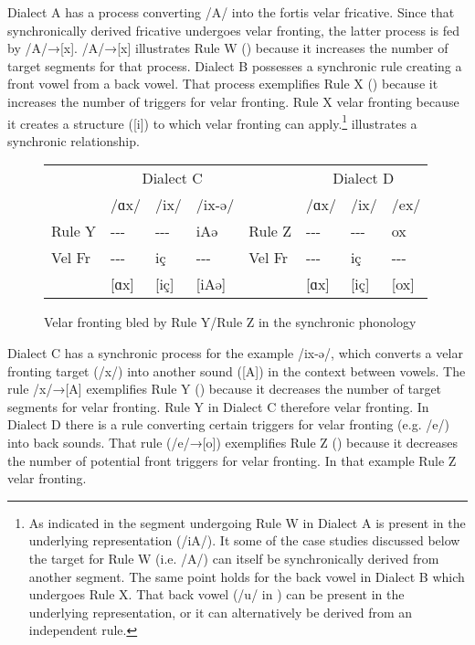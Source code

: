 \begin{xlist}
\begin{xlist}
Dialect A has  a process converting /A/ into the fortis velar fricative. Since that synchronically derived fricative undergoes velar fronting, the latter process is fed by /A/→[x]. /A/→[x] illustrates Rule W () because it increases the number of target segments for that process. Dialect B possesses a synchronic rule creating a front vowel from a back vowel. That process exemplifies Rule X () because it increases the number of triggers for velar fronting. Rule X  velar fronting because it creates a structure ([i]) to which velar fronting can apply.\footnote{\label{fn:2:25}As indicated in  the segment undergoing Rule W in Dialect A is present in the underlying representation (/iA/). It some of the case studies discussed below the target for Rule W (i.e. /A/) can itself be synchronically derived from another segment. The same point holds for the back vowel in Dialect B which undergoes Rule X. That back vowel (/u/ in ) can be present in the underlying representation, or it can alternatively be derived from an independent rule.}  illustrates a synchronic  relationship.

\begin{figure}
\begin{tabular}{*8{l}}
         &  \multicolumn{3}{c}{Dialect C}      &         & \multicolumn{3}{c}{Dialect D} \\\cmidrule(lr){2-4}\cmidrule(lr){6-8}
         &  /ɑx/     &  /ix/       &  /ix-ə/   &         & /ɑx/      & /ix/      & /ex/      \\
  Rule Y & {}-{}-{}- &   {}-{}-{}- &  iAə      & Rule Z  & {}-{}-{}- & {}-{}-{}- & ox        \\
  Vel Fr & {}-{}-{}- &  iç         & {}-{}-{}- & Vel Fr  & {}-{}-{}- &  iç       &  {}-{}-{}-\\
         & [ɑx]      & [iç]        & [iAə]     &         &  [ɑx]     & [iç]      & [ox]      \\
\end{tabular}
\caption{\label{fig:2.7}Velar fronting bled by Rule Y/Rule Z in the synchronic phonology}
\end{figure}

Dialect C has a synchronic process for the example /ix-ə/, which  converts a velar fronting target (/x/) into another sound ([A]) in the context between vowels. The rule /x/→[A] exemplifies Rule Y () because it decreases the number of target segments for velar fronting. Rule Y in Dialect C therefore  velar fronting. In Dialect D there is a rule converting certain triggers for velar fronting (e.g. /e/) into back sounds. That rule (/e/→[o]) exemplifies Rule Z () because it decreases the number of potential front triggers for velar fronting. In that example Rule Z  velar fronting.\largerpage[-1]


\end{xlist}
\end{xlist}
